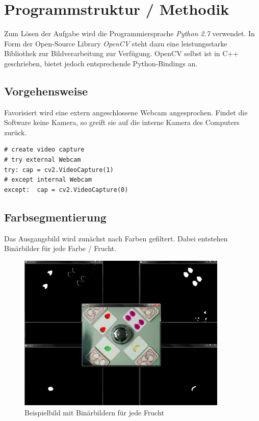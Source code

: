 
\section{Programmstruktur / Methodik}
\label{sec:Programmstruktur}

Zum Lösen der Aufgabe wird die Programmiersprache \emph{Python 2.7} verwendet. In Form der Open-Source Library \emph{OpenCV} steht dazu eine leistungsstarke Bibliothek zur Bildverarbeitung zur Verfügung.
OpenCV selbst ist in C++ geschrieben, bietet jedoch entsprechende Python-Bindings an.


\subsection{Vorgehensweise}

Favorisiert wird eine extern angeschlossene Webcam angesprochen. Findet die Software keine Kamera, so greift sie auf die interne Kamera des Computers zurück. 

\lstset{language=Python}
\begin{lstlisting}[]
# create video capture
# try external Webcam
try: cap = cv2.VideoCapture(1)
# except internal Webcam
except:  cap = cv2.VideoCapture(0)
\end{lstlisting}

\subsection{Farbsegmentierung}

Das Ausgangsbild wird zunächst nach Farben gefiltert. Dabei entstehen Binärbilder für jede Farbe / Frucht. 

\begin{figure}[h]
    \centering
    \includegraphics[width=10cm]{Abbildungen/Binaerbild01}
    \caption[Binär01]{Beispielbild mit Binärbildern für jede Frucht}
    \label{fig:Binär01}
\end{figure}


